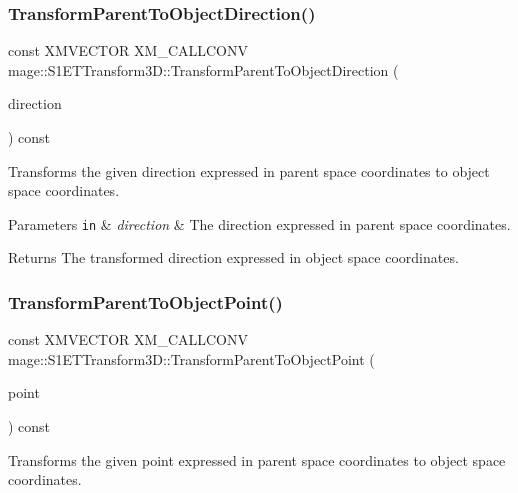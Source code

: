 \subsubsection{\texorpdfstring{Transform\+Parent\+To\+Object\+Direction()}{TransformParentToObjectDirection()}}
{\footnotesize\ttfamily const X\+M\+V\+E\+C\+T\+OR X\+M\+\_\+\+C\+A\+L\+L\+C\+O\+NV mage\+::\+S1\+E\+T\+Transform3\+D\+::\+Transform\+Parent\+To\+Object\+Direction (\begin{DoxyParamCaption}\item[{F\+X\+M\+V\+E\+C\+T\+OR}]{direction }\end{DoxyParamCaption}) const\hspace{0.3cm}{\ttfamily [noexcept]}}

Transforms the given direction expressed in parent space coordinates to object space coordinates.


\begin{DoxyParams}[1]{Parameters}
\mbox{\tt in}  & {\em direction} & The direction expressed in parent space coordinates. \\
\hline
\end{DoxyParams}
\begin{DoxyReturn}{Returns}
The transformed direction expressed in object space coordinates. 
\end{DoxyReturn}
\mbox{\label{classmage_1_1_s1_e_t_transform3_d_aa90c045e5fc78b2ba2f3ec9873c9f14c}} 
\subsubsection{\texorpdfstring{Transform\+Parent\+To\+Object\+Point()}{TransformParentToObjectPoint()}}
{\footnotesize\ttfamily const X\+M\+V\+E\+C\+T\+OR X\+M\+\_\+\+C\+A\+L\+L\+C\+O\+NV mage\+::\+S1\+E\+T\+Transform3\+D\+::\+Transform\+Parent\+To\+Object\+Point (\begin{DoxyParamCaption}\item[{F\+X\+M\+V\+E\+C\+T\+OR}]{point }\end{DoxyParamCaption}) const\hspace{0.3cm}{\ttfamily [noexcept]}}

Transforms the given point expressed in parent space coordinates to object space coordinates.


